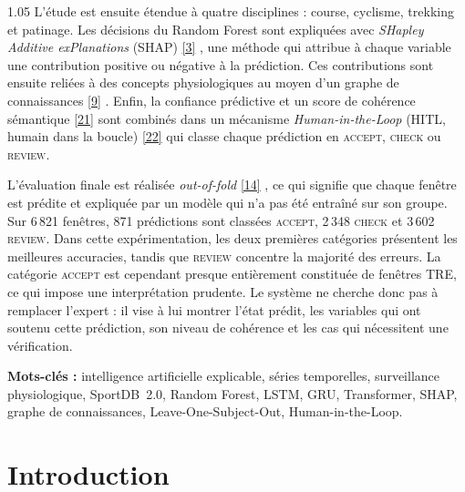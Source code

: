 \documentclass[12pt,a4paper]{article}
\newcommand{\openaccessref}[2]{%
  \nobreak\hspace{0.08em}%
  \href{#2}{\textcolor{green!35!black}{[#1]}}%
}
\begin{document}
\begin{spacing}{1.05}
L'étude est ensuite étendue à quatre disciplines : course, cyclisme, trekking
et patinage. Les décisions du Random Forest sont expliquées avec
\emph{SHapley Additive exPlanations} (SHAP)\openaccessref{3}{https://arxiv.org/abs/1705.07874}, une méthode qui attribue à chaque
variable une contribution positive ou négative à la prédiction. Ces
contributions sont ensuite reliées à des concepts physiologiques au moyen
d'un graphe de connaissances\openaccessref{9}{https://arxiv.org/abs/2003.02320}. Enfin, la confiance prédictive et un score de
cohérence sémantique\openaccessref{21}{https://www.semantic-web-journal.net/system/files/swj2198.pdf} sont combinés dans un mécanisme
\emph{Human-in-the-Loop} (HITL, humain dans la boucle)\openaccessref{22}{https://arxiv.org/abs/2108.00941} qui classe chaque
prédiction en \textsc{accept}, \textsc{check} ou \textsc{review}.

L'évaluation finale est réalisée \emph{out-of-fold}\openaccessref{14}{https://arxiv.org/abs/1904.02666}, ce qui signifie que
chaque fenêtre est prédite et expliquée par un modèle qui n'a pas été entraîné
sur son groupe. Sur 6\,821 fenêtres, 871 prédictions sont classées
\textsc{accept}, 2\,348 \textsc{check} et 3\,602 \textsc{review}. Dans cette
expérimentation, les deux premières catégories présentent les meilleures
accuracies, tandis que \textsc{review} concentre la majorité des erreurs. La
catégorie \textsc{accept} est cependant presque entièrement constituée de
fenêtres TRE, ce qui impose une interprétation prudente. Le système ne cherche
donc pas à remplacer l'expert : il vise à lui montrer l'état prédit, les
variables qui ont soutenu cette prédiction, son niveau de cohérence et les cas
qui nécessitent une vérification.

\noindent\textbf{Mots-clés :} intelligence artificielle explicable, séries
temporelles, surveillance physiologique, SportDB~2.0, Random Forest, LSTM,
GRU, Transformer, SHAP, graphe de connaissances, Leave-One-Subject-Out,
Human-in-the-Loop.

\end{spacing}

\newpage
\tableofcontents

\newpage
\listoffigures
{}

\newpage
\listoftables
{}

\newpage
{}



\section{Introduction}
\label{sec:introduction}
\end{document}
